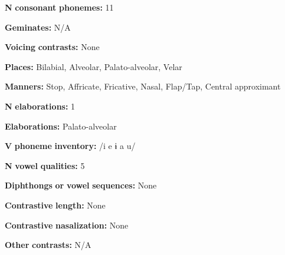\begin{styleBody}
\textbf{N} \textbf{consonant} \textbf{phonemes:} 11
\end{styleBody}

\begin{styleBody}
\textbf{Geminates:} N/A
\end{styleBody}

\begin{styleBody}
\textbf{Voicing} \textbf{contrasts:} None
\end{styleBody}

\begin{styleBody}
\textbf{Places:} Bilabial, Alveolar, Palato-alveolar, Velar
\end{styleBody}

\begin{styleBody}
\textbf{Manners:} Stop, Affricate, Fricative, Nasal, Flap/Tap, Central approximant
\end{styleBody}

\begin{styleBody}
\textbf{N} \textbf{elaborations:} 1
\end{styleBody}

\begin{styleBody}
\textbf{Elaborations:} Palato-alveolar
\end{styleBody}

\begin{styleBody}
\textbf{V} \textbf{phoneme} \textbf{inventory:} /i e ɨ a u/
\end{styleBody}

\begin{styleBody}
\textbf{N} \textbf{vowel} \textbf{qualities:} 5
\end{styleBody}

\begin{styleBody}
\textbf{Diphthongs} \textbf{or} \textbf{vowel} \textbf{sequences:} None
\end{styleBody}

\begin{styleBody}
\textbf{Contrastive} \textbf{length:} None
\end{styleBody}

\begin{styleBody}
\textbf{Contrastive} \textbf{nasalization:} None
\end{styleBody}

\begin{styleBody}
\textbf{Other} \textbf{contrasts:} N/A
\end{styleBody}

